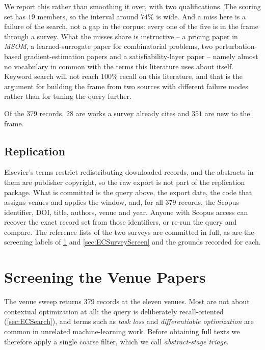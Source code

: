 We report this rather than smoothing it over, with two qualifications. The scoring set has \(19\)
members, so the interval around \(74\%\) is wide. And a miss here is a failure of the search, not a
gap in the corpus: every one of the five is in the frame through a survey. What the misses share is
instructive -- a pricing paper in \emph{MSOM}, a learned-surrogate paper for combinatorial problems,
two perturbation-based gradient-estimation papers and a satisfiability-layer paper -- namely almost
no vocabulary in common with the terms this literature uses about itself. Keyword search will not
reach \(100\%\) recall on this literature, and that is the argument for building the frame from two
sources with different failure modes rather than for tuning the query further.

Of the \(379\) records, \(28\) are works a survey already cites and \(351\) are new to the frame.

\subsection{Replication}

Elsevier's terms restrict redistributing downloaded records, and the abstracts in them are publisher
copyright, so the raw export is not part of the replication package. What is committed is the query
above, the export date, the code that assigns venues and applies the window, and, for all \(379\)
records, the Scopus identifier, DOI, title, authors, venue and year. Anyone with Scopus access can
recover the exact record set from those identifiers, or re-run the query and compare. The reference
lists of the two surveys are committed in full, as are the screening labels of
\cref{sec:ECVenueScreen} and \cref{sec:ECSurveyScreen} and the grounds recorded for each.

\section{Screening the Venue Papers}
\label{sec:ECVenueScreen}

The venue sweep returns \(379\) records at the eleven venues. Most are not about contextual
optimization at all: the query is deliberately recall-oriented (\cref{sec:ECSearch}), and terms such
as \emph{task loss} and \emph{differentiable optimization} are common in unrelated machine-learning
work. Before obtaining full texts we therefore apply a single coarse filter, which we call
\emph{abstract-stage triage}.


